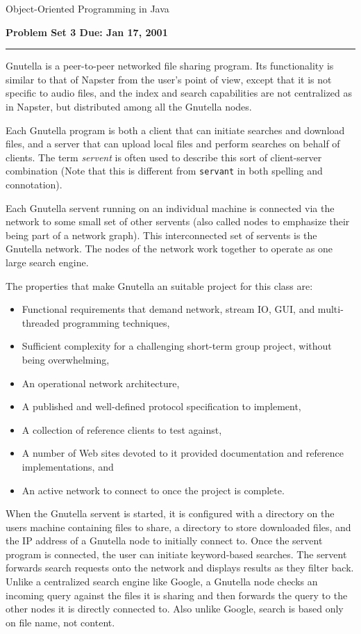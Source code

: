 \documentclass{article}
\newcommand {\heading}[1]{\bigskip\par\noindent{\bf #1 }\par}
\begin{document}
\begin{center}
\LARGE
Object-Oriented Programming in Java
\end{center}
\bigskip
{\noindent\Large\bf Problem Set 3 \hfill Due: Jan 17, 2001}
\hrule
\bigskip
{}
\bigskip

Gnutella is a peer-to-peer networked file sharing program. 
Its functionality is
similar to that of Napster from the user's point of view, except that it
is not specific to audio files, and the index and search capabilities
are not centralized as in Napster, but distributed among all the Gnutella
nodes.

Each Gnutella program is both a client that can initiate searches and download
files, and a server that can upload local files and perform searches
on behalf of clients. The term {\it servent} is often used to 
describe this sort of client-server combination (Note 
that this is different from {\tt servant} in both spelling and connotation).

Each Gnutella servent running on an individual machine is connected via
the network to some small set of other servents (also called nodes to
emphasize their being part of a network graph). This interconnected
set of servents is the Gnutella network. The nodes of the network work
together to operate as one large search engine.

The properties that make Gnutella an suitable project for this class are:
\begin{itemize}
\setlength{\parskip}{0pt}
\item Functional requirements that demand network, stream IO, GUI,
 and multi-threaded programming techniques,
\item Sufficient complexity for a challenging short-term group project,
without being overwhelming,
\item An operational network architecture,
\item A published and well-defined protocol specification to implement,
\item A collection of reference clients to test against,
\item A number of Web sites devoted to it provided documentation and
reference implementations, and
\item An active network to connect to once the project is complete.
\end{itemize}

\heading{Gnutella Servent Operation}

When the Gnutella servent is started, it is configured with a directory
on the users machine containing files to share, a directory 
to store downloaded files, and the IP address
of a Gnutella node to initially connect to. 
Once the servent program is connected, the
user can initiate keyword-based searches. The servent forwards 
search requests onto the network and displays results as they filter back.
Unlike a centralized search engine like Google, a Gnutella node checks an 
incoming query against the files it is sharing and then forwards the 
query to the other nodes it is directly connected to. 
Also unlike Google, search is based only on file name, not content.
\end{document}
